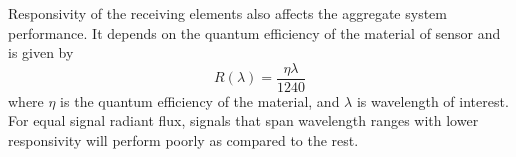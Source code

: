 Responsivity of the receiving elements also affects the aggregate system performance. It depends on the quantum efficiency of the material of sensor and is given by 
\begin{equation}
\label{eqResponsivity}
	 R(\lambda) = \frac{\eta\lambda}{1240}
\end{equation}
where $\eta$ is the quantum efficiency of the material, and $\lambda$ is wavelength of interest. For equal signal radiant flux, signals that span wavelength ranges with lower responsivity will perform poorly as compared to the rest. 


















